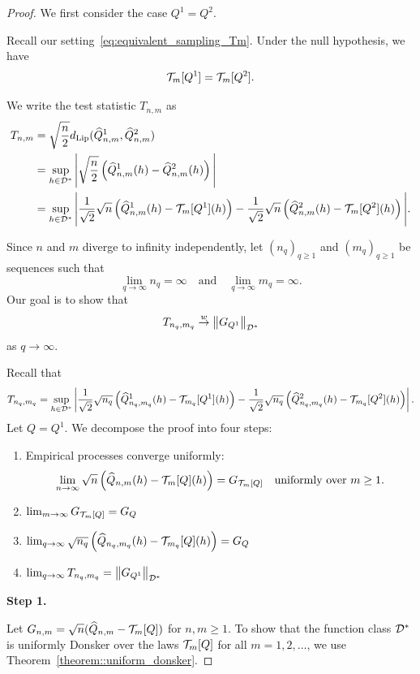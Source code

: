 \begin{proof}




We first consider the case $Q^1 = Q^2$.

Recall our setting~\eqref{eq:equivalent_sampling_Tm}. Under the null hypothesis, we have
\[
\mathcal{T}_m[Q^1] = \mathcal{T}_m[Q^2].
\]

We write the test statistic $T_{n,m}$ as
\begin{align*}
T_{n,m}
&= \sqrt{\frac{n}{2}}d_{\mathrm{Lip}}(\widehat{Q}^1_{n,m},\widehat{Q}^2_{n,m}) \\
&= \sup_{h \in \mathcal{D}^*} \Bigg|\sqrt{\frac{n}{2}}\left(\widehat{Q}^1_{n,m}(h) - \widehat{Q}^2_{n,m}(h) \right) \Bigg| \\
&= \sup_{h \in \mathcal{D}^*} \Bigg|
\frac{1}{\sqrt{2}}\sqrt{n}\left(\widehat{Q}^1_{n,m}(h) - \mathcal{T}_m[Q^1](h) \right)  
 - \frac{1}{\sqrt{2}}\sqrt{n}\left(\widehat{Q}^2_{n,m}(h) - \mathcal{T}_m[Q^2](h) \right)
\Bigg|.
\end{align*}

Since $n$ and $m$ diverge to infinity independently, let $(n_q)_{q\geq 1}$ and $(m_q)_{q\geq 1}$ be sequences such that
\[
\lim_{q \to \infty} n_q = \infty
\quad \text{and} \quad
\lim_{q \to \infty} m_q = \infty.
\]
Our goal is to show that
\[
T_{n_q,m_q} \overset{w}{\to} \left\|G_{Q^1}\right\|_{\mathcal{D}^*}
\]
as $q \to \infty$.

Recall that
\[
T_{n_q, m_q}
= \sup_{h \in \mathcal{D}^*} \left|
\frac{1}{\sqrt{2}}\sqrt{n_q}\left(\widehat{Q}^1_{n_q,m_q}(h) - \mathcal{T}_{m_q}[Q^1](h)\right)
- \frac{1}{\sqrt{2}}\sqrt{n_q}\left(\widehat{Q}^2_{n_q,m_q}(h) - \mathcal{T}_{m_q}[Q^2](h)\right)
\right|.
\]
Let $Q = Q^1$. We decompose the proof into four steps:
\begin{enumerate}
  \item Empirical processes converge uniformly:
    \[
    \lim_{n \to \infty}\sqrt{n}\left(\widehat{Q}_{n,m}(h) - \mathcal{T}_{m}[Q](h)\right) = G_{\mathcal{T}_{m}[Q]}\quad \text{uniformly over } m\geq 1.
    \]
  \item $\lim_{m \to \infty} G_{\mathcal{T}_{m}[Q]} = G_{Q}$
  \item $\lim_{q\to\infty} \sqrt{n_q}\left( \widehat{Q}_{n_q,m_q}(h) - \mathcal{T}_{m_q}[Q](h)\right) = G_{Q}$
  \item $\lim_{q \to \infty} T_{n_q, m_q} = \left\| G_{Q^1} \right\|_{\mathcal{D}^*}$
\end{enumerate}
\textbf{Step 1.}

Let $G_{n,m} = \sqrt{n}(\widehat{Q}_{n,m} - \mathcal{T}_m[Q])$ for $n, m \geq 1$. To show that the function class $\mathcal{D}^*$ is uniformly Donsker over the laws $\mathcal{T}_m[Q]$ for all $m = 1,2,\dots$, we use Theorem~\ref{theorem::uniform_donsker}.


\end{proof}

